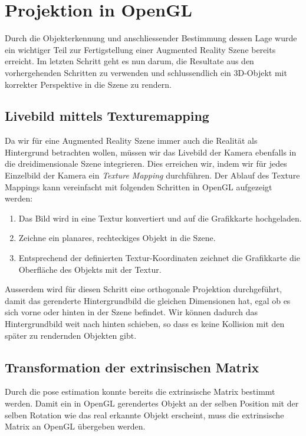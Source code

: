 
\chapter{Projektion in OpenGL}

Durch die Objekterkennung und anschliessender Bestimmung dessen Lage wurde ein wichtiger Teil zur Fertigstellung einer Augmented Reality Szene bereits erreicht. Im letzten Schritt geht es nun darum, die Resultate aus den vorhergehenden Schritten zu verwenden und schlussendlich ein 3D-Objekt mit korrekter Perspektive in die Szene zu rendern.


\section{Livebild mittels Texturemapping}

Da wir für eine Augmented Reality Szene immer auch die Realität als Hintergrund betrachten wollen, müssen wir das Livebild der Kamera ebenfalls in die dreidimensionale Szene integrieren. Dies erreichen wir, indem wir für jedes Einzelbild der Kamera ein \textit{Texture Mapping} durchführen.
Der Ablauf des Texture Mappings kann vereinfacht mit folgenden Schritten in OpenGL aufgezeigt werden:

\begin{enumerate}
\item Das Bild wird in eine Textur konvertiert und auf die Grafikkarte hochgeladen.
\item Zeichne ein planares, rechteckiges Objekt in die Szene.
\item Entsprechend der definierten Textur-Koordinaten zeichnet die Grafikkarte die Oberfläche des Objekts mit der Textur.
\end{enumerate}

Ausserdem wird für diesen Schritt eine orthogonale Projektion durchgeführt, damit das gerenderte Hintergrundbild die gleichen Dimensionen hat, egal ob es sich vorne oder hinten in der Szene befindet. Wir können dadurch das Hintergrundbild weit nach hinten schieben, so dass es keine Kollision mit den später zu rendernden Objekten gibt.


\section{Transformation der extrinsischen Matrix}

Durch die pose estimation konnte bereits die extrinsische Matrix bestimmt werden. Damit ein in OpenGL gerendertes Objekt an der selben Position mit der selben Rotation wie das real erkannte Objekt erscheint, muss die extrinsische Matrix an OpenGL übergeben werden.


